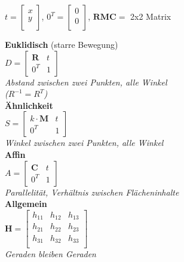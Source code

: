$t=\begin{bmatrix}
    x \\
    y \\
\end{bmatrix}$, $0^T = \begin{bmatrix}
    0 \\
    0 \\
\end{bmatrix}$, $\mathbf{RMC} =$ 2x2 Matrix

\textbf{Euklidisch} (starre Bewegung) \\
$D = \begin{bmatrix}
    \mathbf{R} & t \\
    0^T & 1
\end{bmatrix}$ \\
\textit{Abstand zwischen zwei Punkten, alle Winkel} \\
\textit{($R^{-1} = R^T$)} \\

\textbf{Ähnlichkeit} \\
$S = \begin{bmatrix}
    k \cdot \mathbf{M} & t \\
    0^T & 1
\end{bmatrix}$ \\
\textit{Winkel zwischen zwei Punkten, alle Winkel} \\

\textbf{Affin} \\
$A = \begin{bmatrix}
    \mathbf{C} & t \\
    0^T & 1
\end{bmatrix}$ \\
\textit{Parallelität, Verhältnis zwischen Flächeninhalte} \\

\textbf{Allgemein} \\
$\mathbf{H} = \begin{bmatrix}
    h_{11} & h_{12} & h_{13} \\
    h_{21} & h_{22} & h_{23} \\
    h_{31} & h_{32} & h_{33} \\
\end{bmatrix}$ \\
\textit{Geraden bleiben Geraden} \\
